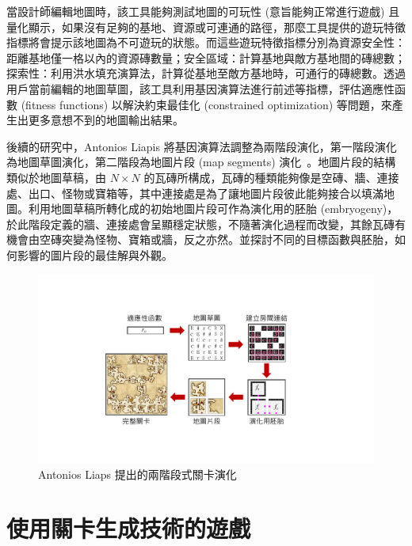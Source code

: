 當設計師編輯地圖時，該工具能夠測試地圖的可玩性 (意旨能夠正常進行遊戲) 且量化顯示，如果沒有足夠的基地、資源或可連通的路徑，那麼工具提供的遊玩特徵指標將會提示該地圖為不可遊玩的狀態。而這些遊玩特徵指標分別為資源安全性：距離基地僅一格以內的資源磚數量；安全區域：計算基地與敵方基地間的磚總數；探索性：利用洪水填充演算法，計算從基地至敵方基地時，可通行的磚總數。透過用戶當前編輯的地圖草圖，該工具利用基因演算法進行前述等指標，評估適應性函數 (fitness functions) 以解決約束最佳化 (constrained optimization) 等問題，來產生出更多意想不到的地圖輸出結果。

後續的研究中，Antonios Liapis 將基因演算法調整為兩階段演化，第一階段演化為地圖草圖演化，第二階段為地圖片段 (map segments) 演化~\cite{liapis2017multi}。地圖片段的結構類似於地圖草稿，由 $N\times N$ 的瓦磚所構成，瓦磚的種類能夠像是空磚、牆、連接處、出口、怪物或寶箱等，其中連接處是為了讓地圖片段彼此能夠接合以填滿地圖。利用地圖草稿所轉化成的初始地圖片段可作為演化用的胚胎 (embryogeny)，於此階段定義的牆、連接處會呈顯穩定狀態，不隨著演化過程而改變，其餘瓦磚有機會由空磚突變為怪物、寶箱或牆，反之亦然。並探討不同的目標函數與胚胎，如何影響的圖片段的最佳解與外觀。

\begin{figure}[ht]
  \begin{center}
    \includegraphics[width=1.0\textwidth]{figures/Multi-segment演化框架.pdf}
    \caption{Antonios Liaps 提出的兩階段式關卡演化} 
    \label{fig:multi-segment-evolution}
  \end{center}
\end{figure}



\section{使用關卡生成技術的遊戲}
\label{sec:relatedworks-gameswithprocedural}

